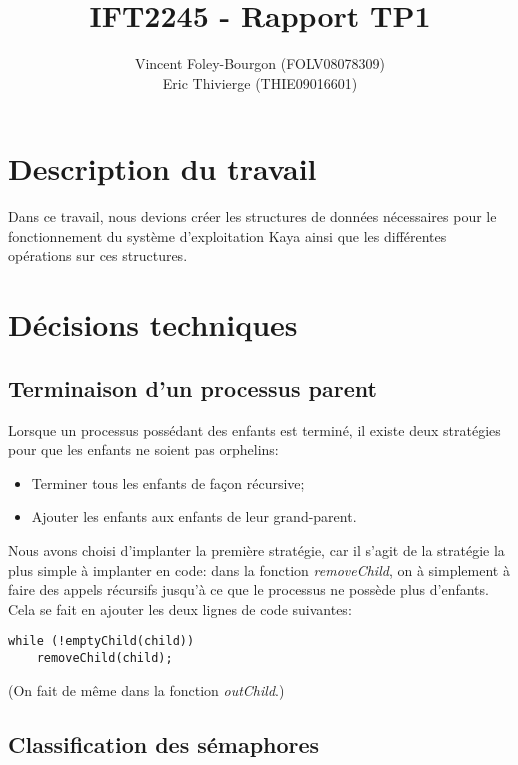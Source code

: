 \documentclass[10pt]{article}
\begin{document}
\title{IFT2245 - Rapport TP1}
\author{Vincent Foley-Bourgon (FOLV08078309) \\
Eric Thivierge (THIE09016601)}
\maketitle

\section{Description du travail}

Dans ce travail, nous devions créer les structures de données
nécessaires pour le fonctionnement du système d'exploitation Kaya
ainsi que les différentes opérations sur ces structures.


\section{Décisions techniques}

\subsection{Terminaison d'un processus parent}

Lorsque un processus possédant des enfants est terminé, il existe deux
stratégies pour que les enfants ne soient pas orphelins:

\begin{itemize}
\item Terminer tous les enfants de façon récursive;
\item Ajouter les enfants aux enfants de leur grand-parent.
\end{itemize}

Nous avons choisi d'implanter la première stratégie, car il s'agit de
la stratégie la plus simple à implanter en code: dans la fonction
\emph{removeChild}, on à simplement à faire des appels récursifs
jusqu'à ce que le processus ne possède plus d'enfants.  Cela se fait
en ajouter les deux lignes de code suivantes:

\begin{verbatim}
while (!emptyChild(child))
    removeChild(child);
\end{verbatim}

(On fait de même dans la fonction \emph{outChild}.)


\subsection{Classification des sémaphores}
\end{document}
